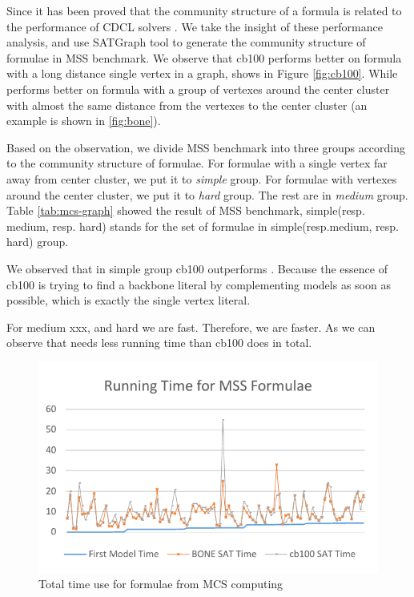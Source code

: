 Since it has been proved that the community structure of a formula is related to the performance of CDCL solvers \cite{NZG2014}. 
We take the insight of these performance analysis, and use SATGraph \cite{NZW2015} tool to generate the community structure of formulae in MSS benchmark. We observe that cb100 performs better on formula with a long distance single vertex in a graph, shows in Figure \ref{fig:cb100}. While \tool performs better on formula with a group of vertexes around the center cluster with almost the same distance from the vertexes to the center cluster (an example is shown in \ref{fig:bone}).

Based on the observation, we divide MSS benchmark into three groups according to the community structure of formulae. For formulae with a single vertex far away from center cluster, we put it to \emph{simple} group. For formulae with vertexes around the center cluster, we put it to \emph{hard} group. The rest are in \emph{medium} group. Table \ref{tab:mcs-graph} showed the result of MSS benchmark, simple(resp. medium, resp. hard) stands for the set of formulae in simple(resp.medium, resp. hard) group.
 
We observed that in simple group cb100 outperforms \tool. Because the essence of cb100 is trying to find a backbone literal by complementing models as soon as possible, which is exactly the single vertex literal.

For medium xxx, and hard we are fast. Therefore, we are faster. As we can observe that \tool needs less running time than cb100 does in total. 

\begin{figure}
    \centering
    \includegraphics[scale=0.7]{mcs.pdf}
   \caption{Total time use for formulae from MCS computing}
   \label{fig:mcs-time}
\end{figure}

